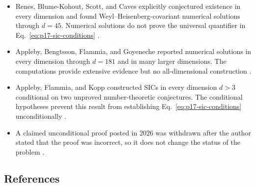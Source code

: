 \begin{itemize}
  \item Renes, Blume-Kohout, Scott, and Caves explicitly conjectured existence
  in every dimension and found Weyl--Heisenberg-covariant numerical solutions
  through $d=45$.  Numerical solutions do not prove the universal quantifier
  in Eq.~\eqref{eq:p17-sic-conditions}
  .

  \item Appleby, Bengtsson, Flammia, and Goyeneche reported numerical solutions
  in every dimension through $d=181$ and in many larger dimensions.  The
  computations provide extensive evidence but no all-dimensional construction
  .

  \item Appleby, Flammia, and Kopp constructed SICs in every dimension $d>3$
  conditional on two unproved number-theoretic conjectures.  The conditional
  hypotheses prevent this result from establishing
  Eq.~\eqref{eq:p17-sic-conditions} unconditionally
  .

  \item A claimed unconditional proof posted in $2026$ was withdrawn after
  the author stated that the proof was incorrect, so it does not change the
  status of the problem
  .
\end{itemize}

\subsection*{References}

